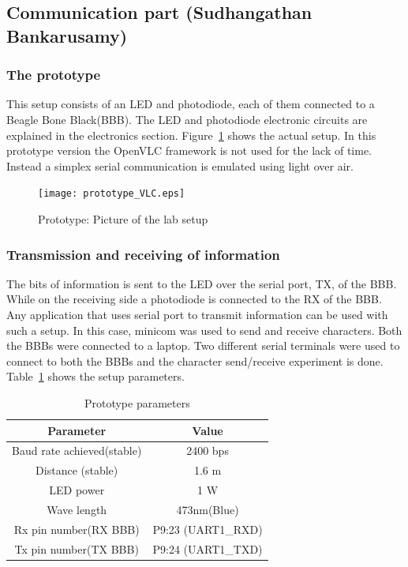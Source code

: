 \subsection{Communication part (Sudhangathan Bankarusamy)}

\subsubsection{The prototype}
This setup consists of an LED and photodiode, each of them connected to a Beagle Bone Black(BBB). The LED and photodiode electronic circuits are explained in the electronics section. Figure~\ref{fig:vlc_proto} shows the actual setup. In this prototype version the OpenVLC framework is not used for the lack of time. Instead a simplex serial communication is emulated using light over air.
\begin{figure}
\centering
        \texttt{[image: prototype\_VLC.eps]}
    \caption{Prototype: Picture of the lab setup}
    \label{fig:vlc_proto}
\end{figure}



\subsubsection{Transmission and receiving of information}
The bits of information is sent to the LED over the serial port, TX, of the BBB. While on the receiving side a photodiode is connected to the RX of the BBB. Any application that uses serial port to transmit information can be used with such a setup. In this case, minicom was used to send and receive characters. Both the BBBs were connected to a laptop. Two different serial terminals were used to connect to both the BBBs and the character send/receive experiment is done. \\
Table~\ref{tab:setupinfo} shows the setup parameters.
\begin{table}[h]
\centering
\caption{Prototype parameters}
\label{tab:setupinfo}
\begin{tabular}{|c|c|}
\hline \textbf{Parameter} & \textbf{Value} \\ 
\hline Baud rate achieved(stable) & 2400 bps \\ 
\hline Distance (stable) & 1.6 m \\
\hline LED power & 1 W \\ 
\hline Wave length & 473nm(Blue) \\ 
\hline Rx pin number(RX BBB) & P9:23 (UART1\_RXD) \\ 
\hline Tx pin number(TX BBB) & P9:24 (UART1\_TXD) \\ 
\hline 
\end{tabular} 
\end{table}



